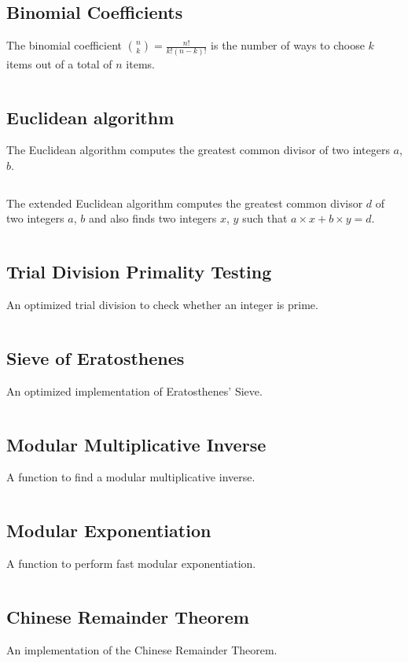 \documentclass[9pt,a4paper,twocolumn,landscape,oneside]{amsart}
\newcommand{\code}[1]{\inputminted{cpp}{_code/#1}}
\begin{document}
    \subsection{Binomial Coefficients}
        The binomial coefficient $\binom{n}{k} = \frac{n!}{k!(n-k)!}$ is the
        number of ways to choose $k$ items out of a total of $n$ items.
        \code{mathematics/nck.cpp}

    \subsection{Euclidean algorithm}
        The Euclidean algorithm computes the greatest common divisor of two
        integers $a$, $b$.
        \code{mathematics/gcd.cpp}

        The extended Euclidean algorithm computes the greatest common divisor
        $d$ of two integers $a$, $b$ and also finds two integers $x$, $y$ such
        that $a\times x + b\times y = d$.
        \code{mathematics/egcd.cpp}

    \subsection{Trial Division Primality Testing}
        An optimized trial division to check whether an integer is prime.
        \code{mathematics/is_prime.cpp}

    \subsection{Sieve of Eratosthenes}
        An optimized implementation of Eratosthenes' Sieve.
        \code{mathematics/prime_sieve.cpp}

    \subsection{Modular Multiplicative Inverse}
        A function to find a modular multiplicative inverse.
        \code{mathematics/mod_inv.cpp}

    \subsection{Modular Exponentiation}
        A function to perform fast modular exponentiation.
        \code{mathematics/mod_pow.cpp}

    \subsection{Chinese Remainder Theorem}
        An implementation of the Chinese Remainder Theorem.
        \code{mathematics/crt.cpp}
\end{document}
